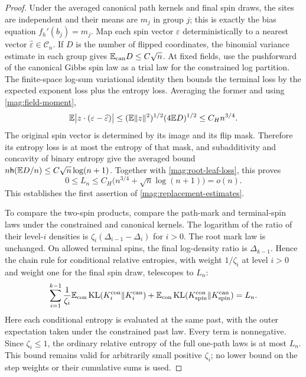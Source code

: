 \begin{proof}
Under the averaged canonical path kernels and final spin draws, the
sites are independent and their means are $m_j$ in group $j$; this is
exactly the bias equation $f_h'(b_j)=m_j$. Map each spin vector
$\varepsilon$ deterministically to a nearest vector
$\widehat\varepsilon\in\mathcal C_n$. If $D$ is the number of flipped
coordinates, the binomial variance estimate in each group gives
$\mathbb E_{\mathrm{can}}D\le C\sqrt n$.
At fixed fields, use the pushforward of the canonical Gibbs spin law as
a trial law for the constrained log partition. The finite-space
log-sum variational identity then bounds the terminal loss by the
expected exponent loss plus the entropy loss. Averaging the former and
using \eqref{mag:field-moment},
\[
 \mathbb E\bigl|z\cdot(\varepsilon-\widehat\varepsilon)\bigr|
 \le(\mathbb E\|z\|^2)^{1/2}(4\mathbb E D)^{1/2}
 \le C_H n^{3/4}.
\]
The original spin vector is determined by its image and its flip mask.
Therefore its entropy loss is at most the entropy of that mask, and
subadditivity and concavity of binary entropy give the averaged bound
$n\mathsf h(\mathbb E D/n)\le C\sqrt n\log(n+1)$.
Together with \eqref{mag:root-leaf-loss}, this proves
\begin{equation}\label{mag:loss-rate}
 0\le L_n\le C_H\bigl(n^{3/4}+\sqrt n\log(n+1)\bigr)=o(n).
\end{equation}
This establishes the first assertion of
\eqref{mag:replacement-estimates}.

To compare the two-spin products, compare the path-mark and terminal-spin
laws under the constrained and canonical kernels. The logarithm of the
ratio of their level-$i$ densities is
$\zeta_i(\Delta_{i-1}-\Delta_i)$ for $i>0$.
The root mark law is unchanged. On allowed terminal spins, the final
log-density ratio is $\Delta_{k-1}$. Hence the chain rule for conditional
relative entropies, with weight $1/\zeta_i$ at level $i>0$ and weight one
for the final spin draw, telescopes to $L_n$:
\begin{equation}\label{mag:weighted-entropy}
 \sum_{i=1}^{k-1}\frac1{\zeta_i}
       \mathbb E_{\mathrm{con}}\operatorname{KL}(K_i^{\mathrm{con}}\Vert K_i^{\mathrm{can}})
 +\mathbb E_{\mathrm{con}}\operatorname{KL}(K_{\mathrm{spin}}^{\mathrm{con}}
                                \Vert K_{\mathrm{spin}}^{\mathrm{can}})
 =L_n.
\end{equation}
Here each conditional entropy is evaluated at the same past, with the
outer expectation taken under the constrained past law. Every term is
nonnegative. Since $\zeta_i\le1$, the ordinary relative entropy of the
full one-path laws is at most $L_n$. This bound remains valid for
arbitrarily small positive $\zeta_i$; no lower bound on the step weights
or their cumulative sums is used.


\end{proof}
